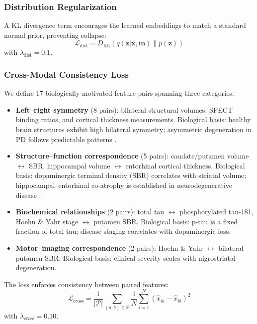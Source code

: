 \documentclass[journal,twoside,web]{ieeecolor}
\begin{document}
\subsubsection{Distribution Regularization}

A KL divergence term encourages the learned embeddings to match a standard normal prior, preventing collapse:
\begin{equation}
    \mathcal{L}_{\text{dist}} = D_{\text{KL}}(q(\mathbf{z} | \mathbf{x}, \mathbf{m}) \| p(\mathbf{z}))
\end{equation}
with $\lambda_{\text{dist}} = 0.1$.

\subsubsection{Cross-Modal Consistency Loss}

We define 17 biologically motivated feature pairs spanning three categories:

\begin{itemize}
    \item \textbf{Left--right symmetry} (8 pairs): bilateral structural volumes, SPECT binding ratios, and cortical thickness measurements. Biological basis: healthy brain structures exhibit high bilateral symmetry; asymmetric degeneration in PD follows predictable patterns \cite{fereshtehnejad2017subtypes}.

    \item \textbf{Structure--function correspondence} (5 pairs): caudate/putamen volume $\leftrightarrow$ SBR, hippocampal volume $\leftrightarrow$ entorhinal cortical thickness. Biological basis: dopaminergic terminal density (SBR) correlates with striatal volume; hippocampal--entorhinal co-atrophy is established in neurodegenerative disease \cite{marek2001dopamine}.

    \item \textbf{Biochemical relationships} (2 pairs): total tau $\leftrightarrow$ phosphorylated tau-181, Hoehn \& Yahr stage $\leftrightarrow$ putamen SBR. Biological basis: p-tau is a fixed fraction of total tau; disease staging correlates with dopaminergic loss.

    \item \textbf{Motor--imaging correspondence} (2 pairs): Hoehn \& Yahr $\leftrightarrow$ bilateral putamen SBR. Biological basis: clinical severity scales with nigrostriatal degeneration.
\end{itemize}

The loss enforces consistency between paired features:
\begin{equation}
    \mathcal{L}_{\text{cross}} = \frac{1}{|\mathcal{P}|} \sum_{(a,b) \in \mathcal{P}} \frac{1}{N} \sum_{i=1}^{N} (\hat{x}_{ia} - \hat{x}_{ib})^2
\end{equation}
with $\lambda_{\text{cross}} = 0.10$.
\end{document}
